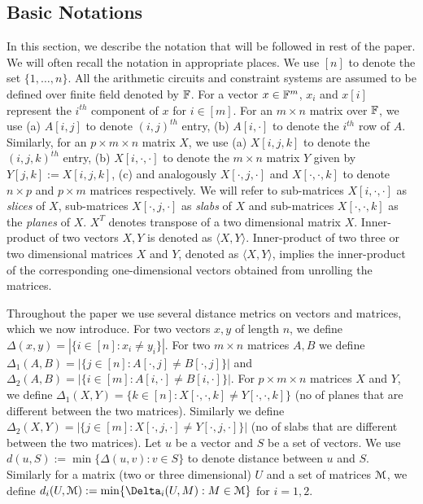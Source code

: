 \subsection{Basic Notations}\label{sec:basicnotation}
In this section, we describe the notation that will be followed in rest of the
paper. We will often recall the notation in appropriate places. 
We use $[n]$ to
denote the set $\{1,\ldots,n\}$. All the arithmetic circuits and constraint
systems are assumed to be defined over finite field denoted by $\mathbb{F}$. For a
vector $x\in \mathbb{F}^m$,  $x_i$ and $x[i]$ represent the $i^{th}$
component of $x$ for $i\in [m]$. %
For an $m\times n$ matrix over
$\mathbb{F}$, we use (a) $A[i,j]$ to denote $(i,j)^{th}$ entry, (b) $A[i,\cdot]$
to denote the $i^{th}$ row of %
$A$. Similarly, for an $p\times m\times n$  matrix $X$, we use (a) $X[i,j,k]$ to
denote the $(i,j,k)^{th}$ entry, (b)  $X[i,\cdot,\cdot]$ to denote
the $m\times n$ matrix $Y$ given by $Y[j,k] := X[i,j,k]$, 
(c) and analogously $X[\cdot,j,\cdot]$ and $X[\cdot,\cdot,k]$ to denote $n\times p$ and $p\times m$
matrices respectively.  We will refer to sub-matrices $X[i,\cdot,\cdot]$ as {\em slices} of
$X$, sub-matrices $X[\cdot,j,\cdot]$ as {\em slabs}  of $X$ and sub-matrices $X[\cdot,\cdot,k]$ as the {\em planes} of $X$. 
$X^T$ denotes transpose of a  two dimensional matrix $X$. Inner-product of two vectors $X,Y$ is denoted as $\langle X,Y\rangle$.
Inner-product of two three or two dimensional  matrices $X$ and $Y$, denoted as 
$\langle X,Y\rangle$,  implies the inner-product of the corresponding one-dimensional vectors obtained from unrolling  the matrices.


Throughout the paper we use several distance metrics on vectors and matrices,
which we now introduce. For two vectors $x,y$ of length $n$, we define
$\Delta(x,y)=|\{i\in [n]: x_i\neq y_i\}|$. For two $m\times n$ matrices $A,B$ we
define $\Delta_1(A,B)=|\{j\in [n]: A[\cdot,j]\neq B[\cdot,j]\}|$ and
$\Delta_2(A,B)=|\{i\in [m]: A[i,\cdot]\neq B[i,\cdot]\}|$. For $p\times m\times
n$ matrices $X$ and $Y$, we define $\Delta_1(X,Y)=\{k\in
[n]:X[\cdot,\cdot,k]\neq Y[\cdot,\cdot,k]\}$ (no of planes that are different between the two matrices). Similarly we define $\Delta_2(X,Y)
= |\{j\in [m]: X[\cdot,j,\cdot]\neq Y[\cdot,j,\cdot]\}|$  (no of slabs that are different between the two matrices). Let $u$ be a vector
and $S$ be a set of vectors. We use $d(u,S) := \min\{\Delta(u,v):v\in S\}$ to
denote distance between $u$ and $S$. Similarly for a matrix (two or three
dimensional) $U$ and a set of matrices $\mathcal{M}$, we define $d_i(U,\mc{M}) :=
\min\{\Delta_i(U,M): M\in \mc{M}\}$ for $i=1,2$.


